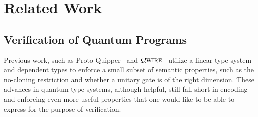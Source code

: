 \documentclass[acmsmall,nonacm,timestamp]{acmart}
\newcommand{\qwire}{\ensuremath{\mathcal{Q}\textsc{wire}}\xspace}
\begin{document}
%





\section{Related Work}
\label{related}


\subsection{Verification of Quantum Programs}
Previous work, such as Proto-Quipper~\cite{ross_algebraic_2015,rios_categorical_2017} and \qwire~\cite{paykin_qwire:_2017,rand_qwire_2017,rand_formally_2018} utilize a linear type system and dependent types to enforce a small subset of semantic properties, such as the no-cloning restriction and whether a unitary gate is of the right dimension. These advances in quantum type systems, although helpful, still fall short in encoding and enforcing even more useful properties that one would like to be able to express for the purpose of verification.
\end{document}
